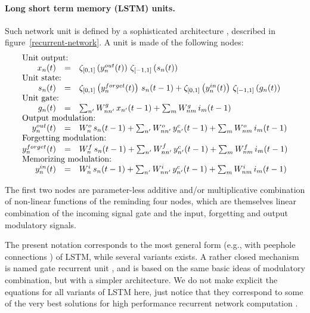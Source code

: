 \paragraph{Long short term memory (LSTM) units.} 

Such network unit is defined by a sophisticated architecture \cite{Hochreiter:1997}, described in figure~\ref{recurrent-network}. A unit is made of the following nodes:
\begin{equation}\label{lstm-network}
\begin{array}{rcl}
\multicolumn{3}{l}{\mbox{Unit output:}} \\
x_n(t) &=& \zeta_{[0,1]}\left(y_n^{out}(t)\right) \, \zeta_{[-1,1]}\left(s_n(t)\right) \\
\multicolumn{3}{l}{\mbox{Unit state:}} \\
s_n(t) &=& \zeta_{[0,1]}\left(y_n^{forget}(t)\right) \, s_n(t-1) + 
          \zeta_{[0,1]}\left(y_n^{in}(t)\right) \, \zeta_{[-1,1]}\left(g_n(t)\right) \\
\multicolumn{3}{l}{\mbox{Unit gate:}} \\
g_n(t) &=& \sum_{n'} W^g_{nn'} \, x_{n'}(t-1) + \sum_{m} W^g_{nm} \, i_m(t-1) \\
\multicolumn{3}{l}{\mbox{Output modulation:}} \\
y_n^{out}(t) &=& W^o_n \, s_n(t-1) + \sum_{n'} W^o_{nn'} \, y_{n'}^c(t-1) + \sum_{m} W^o_{nm} \, i_m(t-1) \\
\multicolumn{3}{l}{\mbox{Forgetting modulation:}} \\
y_n^{forget}(t) &=& W^f_n \, s_n(t-1) + \sum_{n'} W^f_{nn'} \, y_{n'}^c(t-1) + \sum_{m} W^f_{nm} \, i_m(t-1) \\
\multicolumn{3}{l}{\mbox{Memorizing modulation:}} \\
y_n^{in}(t) &=& W^i_n \, s_n(t-1) + \sum_{n'} W^i_{nn'} \, y_{n'}^c(t-1) + \sum_{m} W^i_{nm} \, i_m(t-1)  \\
\end{array}\end{equation}

The first two nodes are parameter-less additive and/or multiplicative combination of non-linear functions of the reminding four nodes, which are themselves linear combination of the incoming signal gate and the input, forgetting and output modulatory signals. 

The present notation corresponds to the most general form (e.g., with peephole connections \cite{Gers:2003}) of LSTM, while several variants exists. A rather closed mechanism is named gate recurrent unit \cite{Cho-2014}, and is based on the same basic ideas of modulatory combination, but with a simpler architecture. We do not make explicit the equations for all variants of LSTM here, just notice that they correspond to some of the very best solutions for high performance recurrent network computation \cite{Schmidhuber:2015}.

